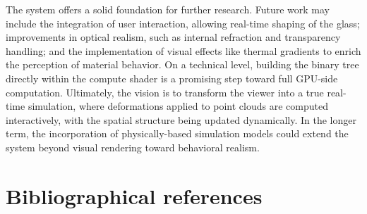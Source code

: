 \documentclass{rapportcs}
\begin{document}
    The system offers a solid foundation for further research. Future work may include the integration of user interaction, allowing real-time shaping of the glass; improvements in optical realism, such as internal refraction and transparency handling; and the implementation of visual effects like thermal gradients to enrich the perception of material behavior. On a technical level, building the binary tree directly within the compute shader is a promising step toward full GPU-side computation. Ultimately, the vision is to transform the viewer into a true real-time simulation, where deformations applied to point clouds are computed interactively, with the spatial structure being updated dynamically. In the longer term, the incorporation of physically-based simulation models could extend the system beyond visual rendering toward behavioral realism.


\newpage
    
\section{Bibliographical references}
    \nocite{*}
    \begingroup
        \renewcommand{\refname}{}%
        \vspace*{-2em} %
    \endgroup
\end{document}
